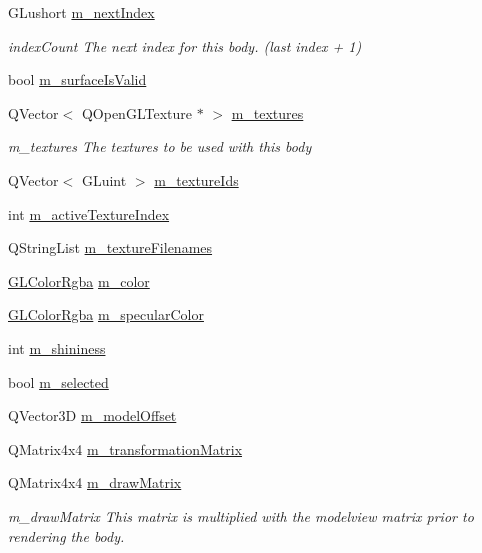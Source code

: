 \begin{DoxyCompactItemize}
G\+Lushort \mbox{\hyperlink{class_g_l_body_a09c31be4c87449e26ec420916e132eac}{m\+\_\+next\+Index}}
\begin{DoxyCompactList}\small\item\em index\+Count The next index for this body. (last index + 1) \end{DoxyCompactList}\item 
bool \mbox{\hyperlink{class_g_l_body_a518355cd5063cb8f7354065f2c521cbc}{m\+\_\+surface\+Is\+Valid}}
\item 
Q\+Vector$<$ Q\+Open\+G\+L\+Texture $\ast$ $>$ \mbox{\hyperlink{class_g_l_body_a741719ede9df7cadd89ff3f86a71eccf}{m\+\_\+textures}}
\begin{DoxyCompactList}\small\item\em m\+\_\+textures The textures to be used with this body \end{DoxyCompactList}\item 
Q\+Vector$<$ G\+Luint $>$ \mbox{\hyperlink{class_g_l_body_a29c73dfe014e2452dd3a2011929aada3}{m\+\_\+texture\+Ids}}
\item 
int \mbox{\hyperlink{class_g_l_body_ad21b09d906e63e5c222ccb96e4d242df}{m\+\_\+active\+Texture\+Index}}
\item 
Q\+String\+List \mbox{\hyperlink{class_g_l_body_a51eed96c1bc0d06742d7a9ab455d527d}{m\+\_\+texture\+Filenames}}
\item 
\mbox{\hyperlink{class_g_l_color_rgba}{G\+L\+Color\+Rgba}} \mbox{\hyperlink{class_g_l_body_a267b5c0fbe5752370197012975663dca}{m\+\_\+color}}
\item 
\mbox{\hyperlink{class_g_l_color_rgba}{G\+L\+Color\+Rgba}} \mbox{\hyperlink{class_g_l_body_ac9db9ed4eb8ca1fbf3e4113c530b92af}{m\+\_\+specular\+Color}}
\item 
int \mbox{\hyperlink{class_g_l_body_a4e6949c8876ffe0bc4fddddfa4dd6c9b}{m\+\_\+shininess}}
\item 
bool \mbox{\hyperlink{class_g_l_body_aa98197c0f7376b5afa58302eb96cb05e}{m\+\_\+selected}}
\item 
Q\+Vector3D \mbox{\hyperlink{class_g_l_body_a8b2d358664d9cac307bee8ba6709b73a}{m\+\_\+model\+Offset}}
\item 
Q\+Matrix4x4 \mbox{\hyperlink{class_g_l_body_a38b323efc7e55b6c770638cd108c2143}{m\+\_\+transformation\+Matrix}}
\item 
Q\+Matrix4x4 \mbox{\hyperlink{class_g_l_body_afd247051378cdf8d444cb7af288cb012}{m\+\_\+draw\+Matrix}}
\begin{DoxyCompactList}\small\item\em m\+\_\+draw\+Matrix This matrix is multiplied with the modelview matrix prior to rendering the body. \end{DoxyCompactList}\item 

\end{DoxyCompactItemize}
